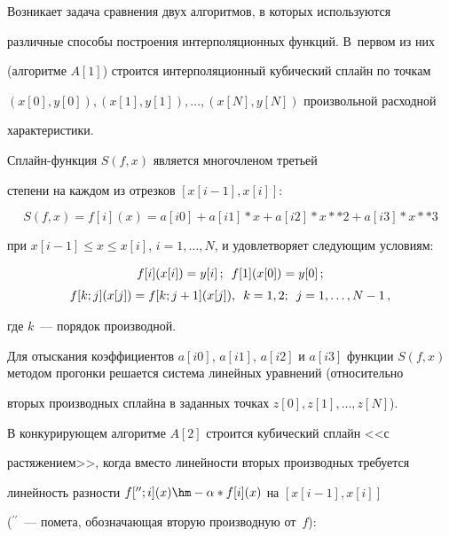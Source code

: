  Возникает задача сравнения двух алгоритмов, в которых используются


различные способы построения интерполяционных функций. В~первом из них


(алгоритме $A[1]$) строится интерполяционный кубический сплайн по точкам


$(x[0], y[0]), (x[1], y[1]),\ldots , (x[N], y[N])$ произвольной расходной


характери\-стики.





Сплайн-функ\-ция $S(f, x)$ является многочленом третьей


степени на каждом из отрезков $[x[i -1], x[i]]$:


  $$


  S(f, x) = f[i](x) = a[i0] + a[i1]* x + a[i2] * x**2 + a[i3] * x**3


  $$


при $x[i-1]\leq x \leq  x[i]$, $i =1,\ldots , N$, и удовлетворяет следующим условиям:


\begin{gather*}


  f[i](x[i]) = y[i]\,;\enskip  f[1](x[0]) = y[0]\,;\\[3pt]


  f[k; j](x[j]) = f[k; j+1](x[j]),\enskip k = 1, 2;\enskip  j=1,\ldots , N-1\,,


\end{gather*}


где $k$~--- порядок производной.





  Для отыскания коэффициентов $a[i0]$, $a[i1]$, $a[i2]$ и $a[i3]$ функции $S(f,


x)$ методом прогонки решается система линейных уравнений (относительно


вторых производных сплайна в заданных точках $z[0], z[1], \ldots , z[N]$).





  В конкурирующем алгоритме $A[2]$ строится кубический сплайн <<с


растяжением>>, когда вместо линейности вторых производных требуется


линейность разности $f[^{\prime\prime}; i](x)\hm-\alpha * f[i](x)$ на $[x[i-1], x[i]]$


($^{\prime\prime}$~--- помета, обозначающая вторую производную от~$f$):


